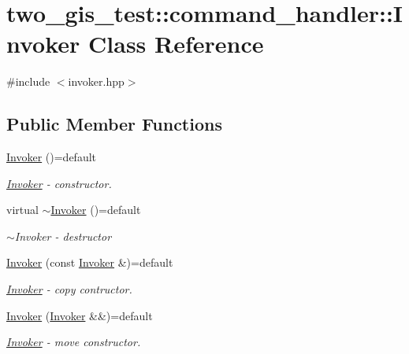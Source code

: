 \hypertarget{classtwo__gis__test_1_1command__handler_1_1_invoker}{}\section{two\+\_\+gis\+\_\+test\+:\+:command\+\_\+handler\+:\+:Invoker Class Reference}
\label{classtwo__gis__test_1_1command__handler_1_1_invoker}


{\ttfamily \#include $<$invoker.\+hpp$>$}

\subsection*{Public Member Functions}
\begin{DoxyCompactItemize}
\item 
\hyperlink{classtwo__gis__test_1_1command__handler_1_1_invoker_a18951d9324c7b97c0f4652591cbafb97}{Invoker} ()=default
\begin{DoxyCompactList}\small\item\em \hyperlink{classtwo__gis__test_1_1command__handler_1_1_invoker}{Invoker} -\/ constructor. \end{DoxyCompactList}\item 
virtual \hyperlink{classtwo__gis__test_1_1command__handler_1_1_invoker_ab6aec58f3120f3c5fe7d6cc75d5d2fa8}{$\sim$\+Invoker} ()=default
\begin{DoxyCompactList}\small\item\em $\sim$\+Invoker -\/ destructor \end{DoxyCompactList}\item 
\hyperlink{classtwo__gis__test_1_1command__handler_1_1_invoker_aa7ea20637e71826d4287050fc5d7ec49}{Invoker} (const \hyperlink{classtwo__gis__test_1_1command__handler_1_1_invoker}{Invoker} \&)=default
\begin{DoxyCompactList}\small\item\em \hyperlink{classtwo__gis__test_1_1command__handler_1_1_invoker}{Invoker} -\/ copy contructor. \end{DoxyCompactList}\item 
\hyperlink{classtwo__gis__test_1_1command__handler_1_1_invoker_aa6dc501d5aba59816c3167a04bc6ef18}{Invoker} (\hyperlink{classtwo__gis__test_1_1command__handler_1_1_invoker}{Invoker} \&\&)=default
\begin{DoxyCompactList}\small\item\em \hyperlink{classtwo__gis__test_1_1command__handler_1_1_invoker}{Invoker} -\/ move constructor. \end{DoxyCompactList}\item 

\end{DoxyCompactItemize}
